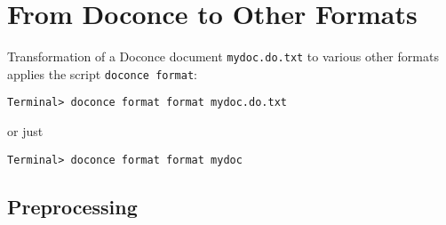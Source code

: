 \documentclass[%
oneside,                 %
final,                   %
10pt]{article}
\begin{document}


\section{From Doconce to Other Formats}

\label{doconce2formats}

Transformation of a Doconce document {\fontsize{10pt}{10pt}\Verb!mydoc.do.txt!} to various other
formats applies the script {\fontsize{10pt}{10pt}\Verb!doconce format!}:
\vspace{4pt}
\begin{Verbatim}[numbers=none,frame=lines,label=\fbox{{\tiny Terminal}},fontsize=\fontsize{9pt}{9pt},
labelposition=topline,framesep=2.5mm,framerule=0.7pt]
Terminal> doconce format format mydoc.do.txt
\end{Verbatim}
or just
\vspace{4pt}
\begin{Verbatim}[numbers=none,frame=lines,label=\fbox{{\tiny Terminal}},fontsize=\fontsize{9pt}{9pt},
labelposition=topline,framesep=2.5mm,framerule=0.7pt]
Terminal> doconce format format mydoc
\end{Verbatim}

\subsection{Preprocessing}
\end{document}
